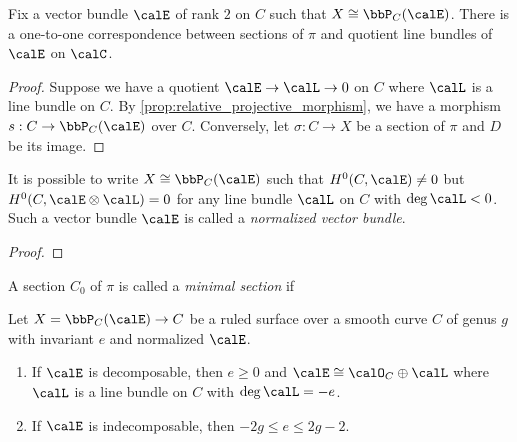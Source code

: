     \begin{lemma}\label{lem:correspondence_between_sections_and_quotient_line_bundles}
        Fix a vector bundle \(\calE\) of rank \(2\) on \(C\) such that \(X \cong \bbP_C(\calE)\).
        There is a one-to-one correspondence between sections of \(\pi\) and quotient line bundles of \(\calE\) on \(\calC\).
    \end{lemma}
    \begin{proof}
        Suppose we have a quotient \(\calE \to \calL \to 0\) on \(C\) where \(\calL\) is a line bundle on \(C\).
        By \cref{prop:relative_projective_morphism}, we have a morphism \(s:C \to \bbP_C(\calE)\) over \(C\).
        Conversely, let \(\sigma:C \to X\) be a section of \(\pi\) and \(D\) be its image.
    \end{proof}

    \begin{lemma}\label{lem:existence_of_normalized_vector_bundle}
        It is possible to write \(X \cong \bbP_C(\calE)\) such that \(H^0(C,\calE) \neq 0\) but \(H^0(C,\calE \otimes \calL) = 0\) for any line bundle \(\calL\) on \(C\) with \(\deg \calL < 0\).
        Such a vector bundle \(\calE\) is called a \emph{normalized vector bundle}.
    \end{lemma}
    \begin{proof}
        
    \end{proof}

    \begin{definition}\label{def:minimal_section_of_ruled_surface}
        A section \(C_0\) of \(\pi\) is called a \emph{minimal section} if 
    \end{definition}

    \begin{lemma}\label{thm:restriction_of_e}
        Let \(X=\bbP_C(\calE) \to C\) be a ruled surface over a smooth curve \(C\) of genus \(g\) with invariant \(e\) and normalized \(\calE\). 
        \begin{enumerate}
            \item If \(\calE\) is decomposable, then \(e \geq 0\) and \(\calE \cong \calO_C \oplus \calL\) where \(\calL\) is a line bundle on \(C\) with \(\deg \calL = -e\).
            \item If \(\calE\) is indecomposable, then \(-2g \leq e \leq 2g - 2\).
        \end{enumerate} 
    \end{lemma}

